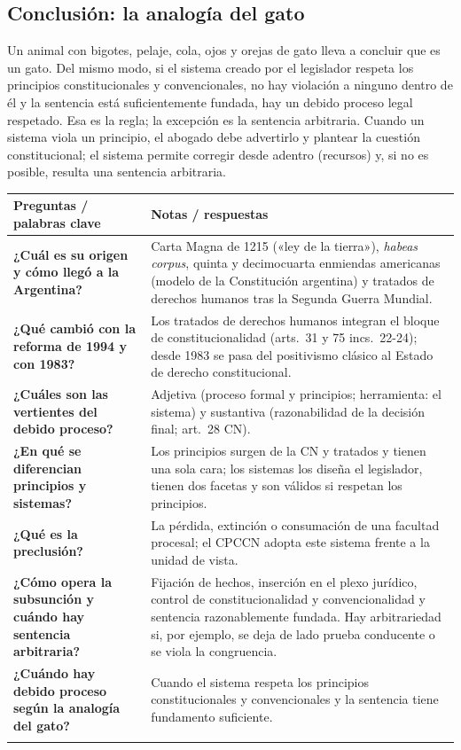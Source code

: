 \documentclass[12pt,oneside]{book}
\newenvironment{cornell}[1]{%
  \par\medskip\noindent{\small\bfseries Cuadro Cornell: #1}\par\smallskip
  \begin{longtable}{|>{\RaggedRight\arraybackslash}p{0.27\textwidth}|>{\RaggedRight\arraybackslash}p{0.66\textwidth}|}
  \hline
  \textbf{\small Preguntas / palabras clave} & \textbf{\small Notas / respuestas} \\ \hline\endhead
}{\end{longtable}\par\medskip}
\newcommand{\cqa}[2]{\textbf{#1} & #2 \\ \hline}
\newcommand{\cornellsummary}[1]{\multicolumn{2}{|p{0.95\textwidth}|}{\textbf{Resumen:} #1} \\ \hline}
\begin{document}
\subsection{Conclusión: la analogía del gato}

Un animal con bigotes, pelaje, cola, ojos y orejas de gato lleva a concluir que es un gato. Del mismo modo, si el sistema creado por el legislador respeta los principios constitucionales y convencionales, no hay violación a ninguno dentro de él y la sentencia está suficientemente fundada, hay un debido proceso legal respetado. Esa es la regla; la excepción es la sentencia arbitraria. Cuando un sistema viola un principio, el abogado debe advertirlo y plantear la cuestión constitucional; el sistema permite corregir desde adentro (recursos) y, si no es posible, resulta una sentencia arbitraria.

\begin{cornell}{debido proceso legal}
\cqa{¿Cuál es su origen y cómo llegó a la Argentina?}{Carta Magna de 1215 («ley de la tierra»), \textit{habeas corpus}, quinta y decimocuarta enmiendas americanas (modelo de la Constitución argentina) y tratados de derechos humanos tras la Segunda Guerra Mundial.}
\cqa{¿Qué cambió con la reforma de 1994 y con 1983?}{Los tratados de derechos humanos integran el bloque de constitucionalidad (arts.~31 y 75 incs.~22-24); desde 1983 se pasa del positivismo clásico al Estado de derecho constitucional.}
\cqa{¿Cuáles son las vertientes del debido proceso?}{Adjetiva (proceso formal y principios; herramienta: el sistema) y sustantiva (razonabilidad de la decisión final; art.~28 CN).}
\cqa{¿En qué se diferencian principios y sistemas?}{Los principios surgen de la CN y tratados y tienen una sola cara; los sistemas los diseña el legislador, tienen dos facetas y son válidos si respetan los principios.}
\cqa{¿Qué es la preclusión?}{La pérdida, extinción o consumación de una facultad procesal; el CPCCN adopta este sistema frente a la unidad de vista.}
\cqa{¿Cómo opera la subsunción y cuándo hay sentencia arbitraria?}{Fijación de hechos, inserción en el plexo jurídico, control de constitucionalidad y convencionalidad y sentencia razonablemente fundada. Hay arbitrariedad si, por ejemplo, se deja de lado prueba conducente o se viola la congruencia.}
\cqa{¿Cuándo hay debido proceso según la analogía del gato?}{Cuando el sistema respeta los principios constitucionales y convencionales y la sentencia tiene fundamento suficiente.}
\cornellsummary{El debido proceso nació en el medioevo inglés y se expandió con el constitucionalismo y los derechos humanos. Se estructura en una vertiente adjetiva, que exige sistemas respetuosos de principios de una sola cara, y una sustantiva, que exige una sentencia razonablemente fundada. La tarea del abogado es detectar cuándo un sistema viola un principio o una sentencia es arbitraria.}
\end{cornell}
\end{document}
